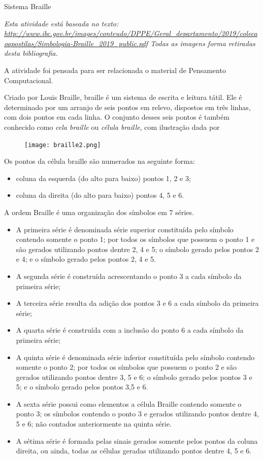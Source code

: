 \begin{task}{Sistema Braille}

\textit{Esta atividade está baseada no texto: 
 \url{http://www.ibc.gov.br/images/conteudo/DPPE/Geral_departamento/2019/colecaoapostilas/Simbologia-Braille_2019_public.pdf} Todas as imagens forma retiradas desta bibliografia.}
 
 
 A atividade foi pensada para ser relacionada o material de Pensamento Computacional.
 
 
 
 Criado por Louis Braille, braille é um sistema de escrita e leitura tátil. Ele é determinado por um arranjo de seis pontos em relevo, dispostos em três linhas, com dois pontos em cada linha. O conjunto desses seis pontos é também conhecido como \textit{cela braille} ou \textit{célula braille}, com ilustração dada por  

\begin{figure}[H]
\centering

\texttt{[image: braille2.png]}
\end{figure}

Os pontos da célula braille são numerados na seguinte forma:

\begin{itemize}
    \item coluna da esquerda (do alto para baixo) pontos 1, 2 e 3;
    \item coluna da direita (do alto para baixo) pontos 4, 5 e 6.
\end{itemize}
A ordem Braille é uma organização dos símbolos em 7 séries.
\begin{itemize}
    \item A primeira série é denominada série superior constituída pelo símbolo contendo somente o ponto 1; por todos os símbolos que possuem o ponto 1 e são gerados utilizando pontos dentre 2, 4 e 5; o símbolo gerado pelos pontos 2 e 4; e o símbolo gerado pelos pontos 2, 4 e 5.
    \item A segunda série é construída acrescentando o ponto 3 a cada símbolo da primeira série;
    \item A terceira série resulta da adição dos pontos 3 e 6 a cada símbolo da primeira série;
    \item A quarta série é construída com a inclusão do ponto 6 a cada símbolo da primeira série;
    \item A quinta série é denominada série inferior constituída pelo símbolo contendo somente o ponto 2; por todos os símbolos que possuem o ponto 2 e são gerados utilizando pontos dentre 3, 5 e 6; o símbolo gerado pelos pontos 3 e 5; e o símbolo gerado pelos pontos 3,5 e 6.
    \item A sexta série possui como elementos a célula Braille contendo somente o ponto 3; os símbolos contendo o ponto 3 e gerados utilizando pontos dentre 4, 5 e 6; não contados anteriormente na quinta série.
    \item A sétima série é formada pelas sinais gerados somente pelos pontos da coluna direita, ou ainda, todas as células geradas utilizando pontos dentre 4, 5 e $6.$
    

\end{itemize}
\end{task}
